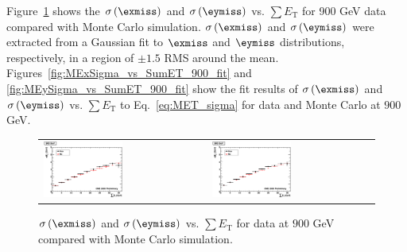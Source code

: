 Figure~\ref{fig:MExySigma_vs_SumET_900} shows the $\sigma\left(\exmiss\right)$ and $\sigma\left(\eymiss\right)$ 
vs. $\sum E_\text{T}$ for 900 GeV data compared with Monte Carlo simulation. $\sigma\left(\exmiss\right)$ and $\sigma\left(\eymiss\right)$
were extracted from a Gaussian fit to $\exmiss$ and $\eymiss$ distributions, respectively, in a region of $\pm 1.5$ RMS around the mean.
Figures~\ref{fig:MExSigma_vs_SumET_900_fit} and \ref{fig:MEySigma_vs_SumET_900_fit} show the fit results 
of $\sigma\left(\exmiss\right)$ and $\sigma\left(\eymiss\right)$ vs. $\sum E_\text{T}$ to Eq.~\ref{eq:MET_sigma} 
for data and Monte Carlo at $900$ GeV.

\begin{figure}[h!]
 \centering
 \begin{tabular}{ll}
  \includegraphics[width=0.5\textwidth]{plots_DataVsMC_MB_900GeV/h_metxsigma_sumet_900.eps} &
  \includegraphics[width=0.5\textwidth]{plots_DataVsMC_MB_900GeV/h_metysigma_sumet_900.eps} \\
 \end{tabular}
 \caption{\small $\sigma\left(\exmiss\right)$ and $\sigma\left(\eymiss\right)$ vs. $\sum E_\text{T}$ for data at $900$ GeV
          compared with Monte Carlo simulation.\label{fig:MExySigma_vs_SumET_900}}
\end{figure}

